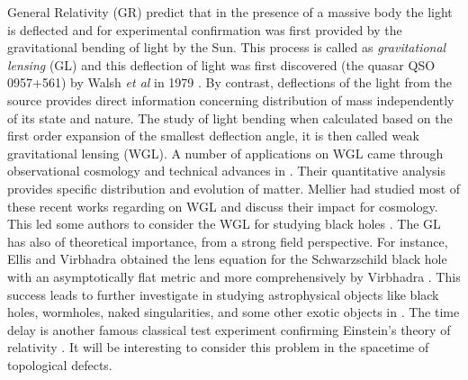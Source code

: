 \documentclass[preprint,superscriptaddress,amsfonts,amssymb,amsmath,showpacs]{revtex4}
\begin{document}
General Relativity (GR) predict that in the presence of a massive body the light is deflected and for experimental confirmation was first provided by the gravitational bending of light by the Sun. This process is called as \textit{gravitational lensing} (GL) and this deflection of light was first discovered (the quasar QSO 0957+561) by Walsh \textit{et al} in 1979 \cite{Walsh}. By contrast, deflections of the light from the source provides direct information concerning distribution of mass independently of its state and nature. The study of light bending when calculated based on the first order expansion of the smallest deflection angle, it is then called weak gravitational lensing (WGL). A number of applications on WGL came through observational cosmology and technical advances in \cite{Klimov,Liebes,Refsdal,Bourassa,RBourassa}. Their quantitative analysis provides specific distribution and evolution of matter. Mellier \cite{Mellier} had studied  most of these recent works regarding on WGL and discuss their impact for cosmology. This led some authors to consider the WGL for studying black holes \cite{Majumdar,Horvath,Gyulchev}. The GL has also of theoretical importance, from a strong field perspective. For instance, Ellis and Virbhadra \cite{KVirbhadra} obtained the lens equation for the Schwarzschild black hole with an asymptotically flat metric \cite{Virbhadra} and more comprehensively by Virbhadra . This success leads to further investigate in studying astrophysical objects like black holes, wormholes, naked singularities, and some other exotic objects in \cite{Perlick,Hasse,Nandi, Eiroa,EEiroa,Clement}. The time delay is another famous classical test experiment confirming Einstein's theory of relativity \cite{weinberg}. It will be interesting to consider this problem in the spacetime of topological defects.
\end{document}
